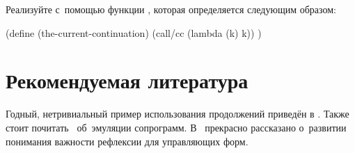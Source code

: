 \begin{exercise}\label{escape/ex:the-current-cc}
Реализуйте  с~помощью функции , которая
определяется следующим образом:

\begin{code:lisp}
(define (the-current-continuation)
  (call/cc (lambda (k) k)) )
\end{code:lisp}
\end{exercise}


\section*{Рекомендуемая литература}\label{escape/sect:recommended-reading}

Годный, нетривиальный пример использования продолжений приведён в
\cite{wan80a}. Также стоит почитать~\cite{hfw84} об~эмуляции сопрограмм.
В~\cite{dr87} прекрасно рассказано о~развитии понимания важности рефлексии
для управляющих форм.
